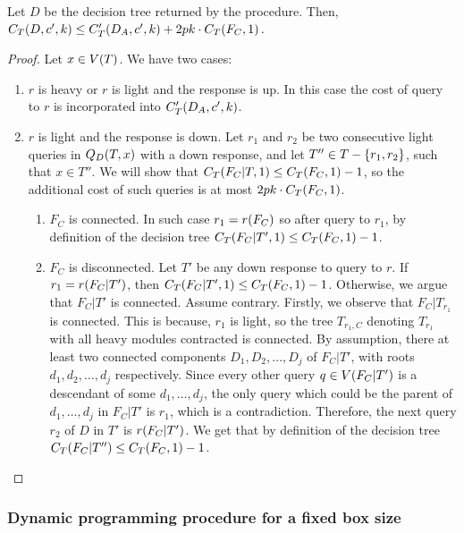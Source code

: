 \begin{lemma}
Let $D$ be the decision tree returned by the \FMergeDTs procedure. Then, $
            C_{T}\mathopen{}\left( D,c',k \right)\leq C'_{T}\mathopen{}\left( D_A,c',k \right)+2pk\cdot C_{T}\mathopen{}\left( F_C,1 \right).
        $
\begin{proof}
     Let $x\in V\mathopen{}\left( T \right)$. We have two cases:
    \begin{enumerate}
        \item $r$ is heavy or $r$ is light and the response is up. In this case the cost of query to $r$ is incorporated into $C'_{T}\mathopen{}\left( D_A,c',k \right)$.
        \item $r$ is light and the response is down. Let  $r_1$ and $r_2$ be two consecutive light queries in $Q_D\mathopen{}\left( T,x \right)$ with a down response, and let $T''\in T-\mathopen{}\left\{ r_1, r_2 \right\}$, such that $x\in T''$. We will show that $C_{T}\mathopen{}\left( F_C|T,1 \right)\leq C_{T}\mathopen{}\left( F_C,1 \right)-1$, so the additional cost of such queries is at most $2pk\cdot C_{T}\mathopen{}\left( F_C,1 \right)$.
        \begin{enumerate}
            \item $F_C$ is connected. In such case $r_1=r\mathopen{}\left( F_C \right)$ so after query to $r_1$, by definition of the decision tree $C_{T}\mathopen{}\left( F_C|T',1 \right)\leq C_{T}\mathopen{}\left( F_C,1 \right)-1$.
            
            \item $F_C$ is disconnected. Let $T'$ be any down response to query to $r$. If $r_1=r\mathopen{}\left( F_C|T' \right)$, then $C_{T}\mathopen{}\left( F_C|T',1 \right)\leq C_{T}\mathopen{}\left( F_C,1 \right) - 1$. Otherwise, we argue that $F_C|T'$ is connected. Assume contrary. Firstly, we observe that $F_{C}|T_{r_1}$ is connected. This is because, $r_1$ is light, so the tree $T_{r_1,C}$ denoting $T_{r_1}$ with all heavy modules contracted is connected. By assumption, there at least two connected components $D_1,D_2,\dots,D_j$ of $F_C|T'$, with roots $d_1,d_2,\dots, d_j$ respectively. Since every other query $q\in V\mathopen{}\left( F_C|T' \right)$ is a descendant of some $d_1,\dots,d_j$, the only query which could be the parent of $d_1,\dots, d_j$ in $F_C|T'$ is $r_1$, which is a contradiction. Therefore, the next query $r_2$ of $D$ in $T'$ is $r\mathopen{}\left( F_C|T' \right)$. We get that by definition of the decision tree $C_{T}\mathopen{}\left( F_C|T'' \right)\leq C_{T}\mathopen{}\left( F_C,1 \right)-1$.
        \end{enumerate} 
    \end{enumerate}
\end{proof}
\end{lemma}


\subsubsection{Dynamic programming procedure for a fixed box size}

